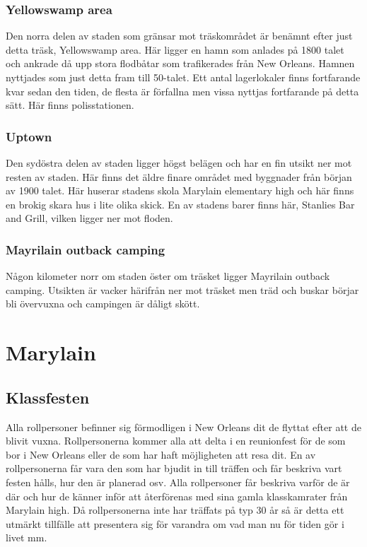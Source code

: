 \documentclass[a5paper,10pt]{report}
\begin{document}
\subsection{Yellowswamp area}
Den norra delen av staden som gränsar mot träskområdet är benämnt efter just detta träsk, Yellowswamp area. Här ligger en hamn som anlades på 1800 talet och ankrade då upp stora flodbåtar som trafikerades från New Orleans. Hamnen nyttjades som just detta fram till 50-talet. Ett antal lagerlokaler finns fortfarande kvar sedan den tiden, de flesta är förfallna men vissa nyttjas fortfarande på detta sätt. Här finns polisstationen.
\subsection{Uptown}
Den sydöstra delen av staden ligger högst belägen och har en fin utsikt ner mot resten av staden. Här finns det äldre finare området med byggnader från början av 1900 talet. Här huserar stadens skola Marylain elementary high och här finns en brokig skara hus i lite olika skick. En av stadens barer finns här, Stanlies Bar and Grill, vilken ligger ner mot floden.
\subsection{Mayrilain outback camping}
Någon kilometer norr om staden öster om träsket ligger Mayrilain outback camping. Utsikten är vacker härifrån ner mot träsket men träd och buskar börjar bli övervuxna och campingen är dåligt skött.
\chapter{Marylain}

\section{Klassfesten}
Alla rollpersoner befinner sig förmodligen i New Orleans dit de flyttat efter att de blivit vuxna. Rollpersonerna kommer alla att delta i en reunionfest för de som bor i New Orleans eller de som har haft möjligheten att resa dit. En av rollpersonerna får vara den som har bjudit in till träffen och får beskriva vart festen hålls, hur den är planerad osv. Alla rollpersoner får beskriva varför de är där och hur de känner inför att återförenas med sina gamla klasskamrater från Marylain high. Då rollpersonerna inte har träffats på typ 30 år så är detta ett utmärkt tillfälle att presentera sig för varandra om vad man nu för tiden gör i livet mm.
\end{document}
